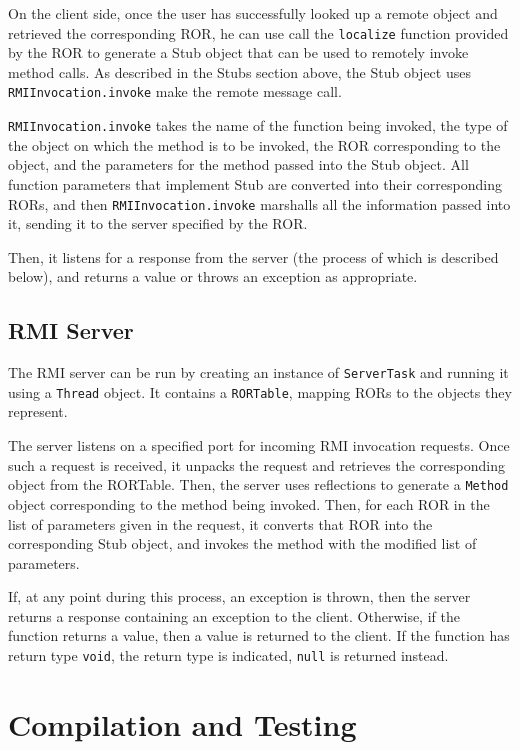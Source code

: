\documentclass{scrartcl}
\begin{document}
On the client side, once the user has successfully looked up a remote object and retrieved the corresponding ROR, he can use call the \verb$localize$ function provided by the ROR to generate a Stub object that can be used to remotely invoke method calls.  As described in the Stubs section above, the Stub object uses \verb$RMIInvocation.invoke$ make the remote message call.

\verb$RMIInvocation.invoke$ takes the name of the function being invoked, the type of the object on which the method is to be invoked, the ROR corresponding to the object, and the parameters for the method passed into the Stub object.  All function parameters that implement Stub are converted into their corresponding RORs, and then \verb$RMIInvocation.invoke$ marshalls all the information passed into it, sending it to the server specified by the ROR.

Then, it listens for a response from the server (the process of which is described below), and returns a value or throws an exception as appropriate.

\subsection{RMI Server}

The RMI server can be run by creating an instance of \verb$ServerTask$ and running it using a \verb$Thread$ object.  It contains a \verb$RORTable$, mapping RORs to the objects they represent.

The server listens on a specified port for incoming RMI invocation requests.  Once such a request is received, it unpacks the request and retrieves the corresponding object from the RORTable.  Then, the server uses reflections to generate a \verb$Method$ object corresponding to the method being invoked.  Then, for each ROR in the list of parameters given in the request, it converts that ROR into the corresponding Stub object, and invokes the method with the modified list of parameters.

If, at any point during this process, an exception is thrown, then the server returns a response containing an exception to the client.  Otherwise, if the function returns a value, then a value is returned to the client.  If the function has return type \verb$void$, the return type is indicated, \verb$null$ is returned instead.

\section{Compilation and Testing}
\end{document}
